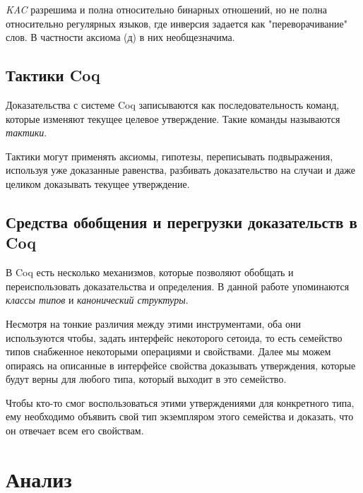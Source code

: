 \documentclass[times
              ]{itmo-student-thesis}
\begin{document}
    \textit{KAC} разрешима и полна относительно бинарных отношений, но не полна относительно регулярных языков, где инверсия задается как "переворачивание" слов.
    В частности аксиома (д) в них необщезначима.

  \subsection{Тактики Coq}
    Доказательства с системе Coq записываются как последовательность команд, которые изменяют текущее целевое утверждение. Такие команды называются \textit{тактики}.

    Тактики могут применять аксиомы, гипотезы, переписывать подвыражения, используя уже доказанные равенства, разбивать доказательство на случаи и даже целиком доказывать текущее утверждение.

  \subsection{Средства обобщения и перегрузки доказательств в Coq}

    В Coq есть несколько механизмов, которые позволяют обобщать и переиспользовать доказательства и определения.
    В данной работе упоминаются \textit{классы типов} и \textit{канонический структуры}.

    Несмотря на тонкие различия между этими инструментами, оба они используются чтобы, задать интерфейс некоторого сетоида, то есть семейство типов снабженное некоторыми операциями и свойствами.
    Далее мы можем опираясь на описанные в интерфейсе свойства доказывать утверждения, которые будут верны для любого типа, который выходит в это семейство.

    Чтобы кто-то смог воспользоваться этими утверждениями для конкретного типа, ему необходимо объявить свой тип экземпляром этого семейства и доказать, что он отвечает всем его свойствам.


  \section{Анализ}
\end{document}
